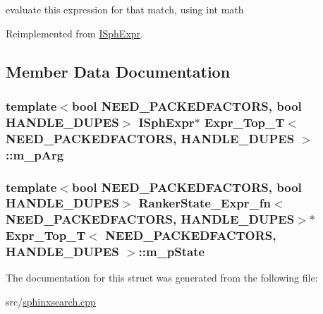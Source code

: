evaluate this expression for that match, using int math 



Reimplemented from \hyperlink{structISphExpr_a32fb4380bed5d788ce29c0c659b2e917}{I\-Sph\-Expr}.



\subsection{Member Data Documentation}
\hypertarget{structExpr__Top__T_a306e53b0991fc3bc4255bf04d0916ac1}{
\subsubsection[{m\-\_\-p\-Arg}]{\setlength{\rightskip}{0pt plus 5cm}template$<$bool N\-E\-E\-D\-\_\-\-P\-A\-C\-K\-E\-D\-F\-A\-C\-T\-O\-R\-S, bool H\-A\-N\-D\-L\-E\-\_\-\-D\-U\-P\-E\-S$>$ {\bf I\-Sph\-Expr}$\ast$ {\bf Expr\-\_\-\-Top\-\_\-\-T}$<$ N\-E\-E\-D\-\_\-\-P\-A\-C\-K\-E\-D\-F\-A\-C\-T\-O\-R\-S, H\-A\-N\-D\-L\-E\-\_\-\-D\-U\-P\-E\-S $>$\-::m\-\_\-p\-Arg}}\label{structExpr__Top__T_a306e53b0991fc3bc4255bf04d0916ac1}
\hypertarget{structExpr__Top__T_acb9a236bae6b87fc812e0d7cf5fd6498}{
\subsubsection[{m\-\_\-p\-State}]{\setlength{\rightskip}{0pt plus 5cm}template$<$bool N\-E\-E\-D\-\_\-\-P\-A\-C\-K\-E\-D\-F\-A\-C\-T\-O\-R\-S, bool H\-A\-N\-D\-L\-E\-\_\-\-D\-U\-P\-E\-S$>$ {\bf Ranker\-State\-\_\-\-Expr\-\_\-fn}$<$N\-E\-E\-D\-\_\-\-P\-A\-C\-K\-E\-D\-F\-A\-C\-T\-O\-R\-S, H\-A\-N\-D\-L\-E\-\_\-\-D\-U\-P\-E\-S$>$$\ast$ {\bf Expr\-\_\-\-Top\-\_\-\-T}$<$ N\-E\-E\-D\-\_\-\-P\-A\-C\-K\-E\-D\-F\-A\-C\-T\-O\-R\-S, H\-A\-N\-D\-L\-E\-\_\-\-D\-U\-P\-E\-S $>$\-::m\-\_\-p\-State}}\label{structExpr__Top__T_acb9a236bae6b87fc812e0d7cf5fd6498}


The documentation for this struct was generated from the following file\-:\begin{DoxyCompactItemize}
\item 
src/\hyperlink{sphinxsearch_8cpp}{sphinxsearch.\-cpp}\end{DoxyCompactItemize}
